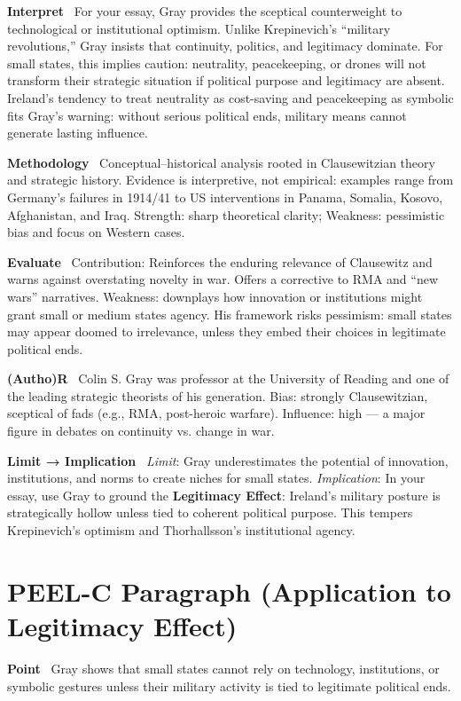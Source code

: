 \textbf{Interpret} \
For your essay, Gray provides the sceptical counterweight to technological or institutional optimism. Unlike Krepinevich’s “military revolutions,” Gray insists that continuity, politics, and legitimacy dominate. For small states, this implies caution: neutrality, peacekeeping, or drones will not transform their strategic situation if political purpose and legitimacy are absent. Ireland’s tendency to treat neutrality as cost-saving and peacekeeping as symbolic fits Gray’s warning: without serious political ends, military means cannot generate lasting influence.

\textbf{Methodology} \
Conceptual–historical analysis rooted in Clausewitzian theory and strategic history. Evidence is interpretive, not empirical: examples range from Germany’s failures in 1914/41 to US interventions in Panama, Somalia, Kosovo, Afghanistan, and Iraq. Strength: sharp theoretical clarity; Weakness: pessimistic bias and focus on Western cases.

\textbf{Evaluate} \
Contribution: Reinforces the enduring relevance of Clausewitz and warns against overstating novelty in war. Offers a corrective to RMA and “new wars” narratives. Weakness: downplays how innovation or institutions might grant small or medium states agency. His framework risks pessimism: small states may appear doomed to irrelevance, unless they embed their choices in legitimate political ends.

\textbf{(Autho)R} \
Colin S. Gray was professor at the University of Reading and one of the leading strategic theorists of his generation. Bias: strongly Clausewitzian, sceptical of fads (e.g., RMA, post-heroic warfare). Influence: high — a major figure in debates on continuity vs. change in war.

\textbf{Limit → Implication} \
\textit{Limit}: Gray underestimates the potential of innovation, institutions, and norms to create niches for small states.
\textit{Implication}: In your essay, use Gray to ground the \textbf{Legitimacy Effect}: Ireland’s military posture is strategically hollow unless tied to coherent political purpose. This tempers Krepinevich’s optimism and Thorhallsson’s institutional agency.

\section*{PEEL-C Paragraph (Application to Legitimacy Effect)}

\textbf{Point} \
Gray shows that small states cannot rely on technology, institutions, or symbolic gestures unless their military activity is tied to legitimate political ends.

